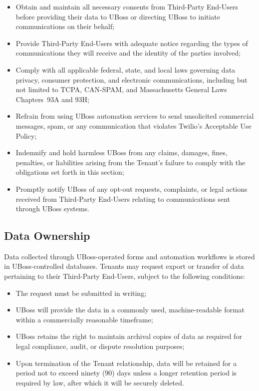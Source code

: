 \documentclass[11pt, letterpaper]{article}
\begin{document}
\begin{itemize}
    \item Obtain and maintain all necessary consents from Third-Party End-Users before
          providing their data to UBoss or directing UBoss to initiate communications
          on their behalf;
    \item Provide Third-Party End-Users with adequate notice regarding the types of
          communications they will receive and the identity of the parties involved;
    \item Comply with all applicable federal, state, and local laws governing data
          privacy, consumer protection, and electronic communications, including but
          not limited to TCPA, CAN-SPAM, and Massachusetts General Laws Chapters~93A
          and 93H;
    \item Refrain from using UBoss automation services to send unsolicited commercial
          messages, spam, or any communication that violates Twilio's Acceptable Use
          Policy;
    \item Indemnify and hold harmless UBoss from any claims, damages, fines, penalties,
          or liabilities arising from the Tenant's failure to comply with the
          obligations set forth in this section;
    \item Promptly notify UBoss of any opt-out requests, complaints, or legal actions
          received from Third-Party End-Users relating to communications sent through
          UBoss systems.
\end{itemize}

\subsection{Data Ownership}

Data collected through UBoss-operated forms and automation workflows is stored in
UBoss-controlled databases. Tenants may request export or transfer of data pertaining
to their Third-Party End-Users, subject to the following conditions:

\begin{itemize}
    \item The request must be submitted in writing;
    \item UBoss will provide the data in a commonly used, machine-readable format within
          a commercially reasonable timeframe;
    \item UBoss retains the right to maintain archival copies of data as required for
          legal compliance, audit, or dispute resolution purposes;
    \item Upon termination of the Tenant relationship, data will be retained for a period
          not to exceed ninety (90) days unless a longer retention period is required by
          law, after which it will be securely deleted.
\end{itemize}
\end{document}
